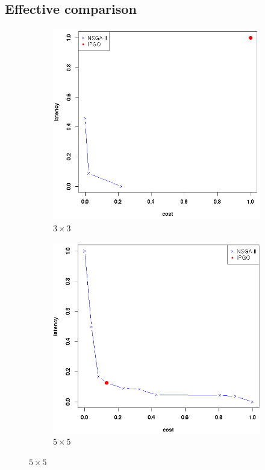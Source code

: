 \documentclass{llncs}
\begin{document}
\subsection{Effective comparison}
\label{sec:comparison}
\begin{figure}[H]
	\centering
	\begin{subfigure}[b]{0.49\textwidth}
		\includegraphics[width=\textwidth]{pics/122.png}
		\caption{$3 \times 3$}
		\label{fig:3_3}
	\end{subfigure}%
	\begin{subfigure}[b]{0.49\textwidth}
		\includegraphics[width=\textwidth]{pics/123.png}
		\caption{$5 \times 5$}
		\label{fig:5_5}
	\end{subfigure}



\end{figure}
\end{document}
